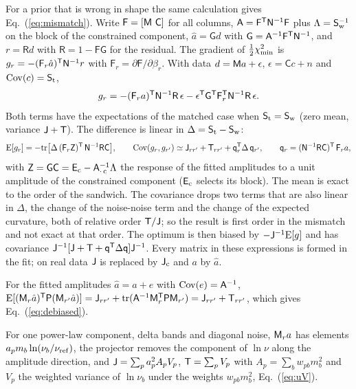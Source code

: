 For a prior that is wrong in shape the same calculation gives Eq.~(\ref{eq:mismatch}). Write
$\mathsf{F} = [\mathsf{M}\ \mathsf{C}]$ for all columns, $\mathsf{A} = \mathsf{F}^{\mathsf{T}}\mathsf{N}^{-1}\mathsf{F}$ plus $\Lambda =
\mathsf{S}_{\rm w}^{-1}$ on the block of the constrained component, $\hat a = \mathsf{G} d$ with
$\mathsf{G} = \mathsf{A}^{-1}\mathsf{F}^{\mathsf{T}}\mathsf{N}^{-1}$, and $r = \mathsf{R} d$ with $\mathsf{R} = 1 - \mathsf{F}\mathsf{G}$
for the residual. The gradient of $\tfrac12\chi^2_{\min}$ is $g_r = -(\mathsf{F}_r\hat a)^{\mathsf{T}}\mathsf{N}^{-1} r$ with
$\mathsf{F}_r = \partial\mathsf{F}/\partial\beta_r$. With data $d = \mathsf{M} a + \epsilon$, $\epsilon = \mathsf{C} c + n$
and $\mathrm{Cov}(c) = \mathsf{S}_{\rm t}$,
\begin{equation}
  g_r = -(\mathsf{F}_r a)^{\mathsf{T}}\mathsf{N}^{-1}\mathsf{R}\,\epsilon - \epsilon^{\mathsf{T}}\mathsf{G}^{\mathsf{T}}\mathsf{F}_r^{\mathsf{T}}\mathsf{N}^{-1}\mathsf{R}\,\epsilon .
\end{equation}
Both terms have the expectations of the matched case when $\mathsf{S}_{\rm t} = \mathsf{S}_{\rm w}$ (zero mean,
variance $\mathsf{J} + \mathsf{T}$). The difference is linear in $\Delta = \mathsf{S}_{\rm t} - \mathsf{S}_{\rm w}$:
\begin{equation}
  \mathrm{E}[g_r] = -\mathrm{tr}\big[\Delta\,(\mathsf{F}_r\mathsf{Z})^{\mathsf{T}}\,\mathsf{N}^{-1}\mathsf{R}\mathsf{C}\big], \qquad
  \mathrm{Cov}(g_r, g_{r'}) \simeq \mathsf{J}_{rr'} + \mathsf{T}_{rr'} + \mathsf{q}_r^{\mathsf{T}}\Delta\,\mathsf{q}_{r'}, \qquad
  \mathsf{q}_r = (\mathsf{N}^{-1}\mathsf{R}\mathsf{C})^{\mathsf{T}}\,\mathsf{F}_r a ,
\end{equation}
with $\mathsf{Z} = \mathsf{G}\mathsf{C} = \mathsf{E}_{\rm c} - \mathsf{A}^{-1}_{\cdot\,{\rm c}}\Lambda$ the response of the
fitted amplitudes to a unit amplitude of the constrained component ($\mathsf{E}_{\rm c}$ selects its
block). The mean is exact to the order of the sandwich. The covariance drops two terms that are also
linear in $\Delta$, the change of the noise-noise term and the change of the expected curvature, both
of relative order $\mathsf{T}/\mathsf{J}$; so the result is first order in the mismatch and not exact at that order. The optimum is then biased by $-\mathsf{J}^{-1}\mathrm{E}[g]$ and has covariance
$\mathsf{J}^{-1}[\mathsf{J} + \mathsf{T} + \mathsf{q}^{\mathsf{T}}\Delta\mathsf{q}]\mathsf{J}^{-1}$. Every matrix in these expressions is formed in the
fit; on real data $\mathsf{J}$ is replaced by $\mathsf{J}_{\rm c}$ and $a$ by $\hat a$.

For the fitted amplitudes $\hat a = a + e$ with $\mathrm{Cov}(e) = \mathsf{A}^{-1}$,
$\mathrm{E}[(\mathsf{M}_r\hat a)^{\mathsf{T}}\mathsf{P}(\mathsf{M}_{r'}\hat a)] = \mathsf{J}_{rr'} + \mathrm{tr}(\mathsf{A}^{-1}\mathsf{M}_r^{\mathsf{T}}\mathsf{P}\mathsf{M}_{r'}) = \mathsf{J}_{rr'} + \mathsf{T}_{rr'}$,
which gives Eq.~(\ref{eq:debiased}).

For one power-law component, delta bands and diagonal noise, $\mathsf{M}_r a$ has elements
$a_p m_b \ln(\nu_b/\nu_{\mathrm{ref}})$, the projector removes the component of $\ln\nu$ along the amplitude
direction, and $\mathsf{J} = \sum_p a_p^2 A_p V_p$, $\mathsf{T} = \sum_p V_p$ with $A_p = \sum_b w_{pb}m_b^2$ and
$V_p$ the weighted variance of $\ln\nu_b$ under the weights $w_{pb}m_b^2$, Eq.~(\ref{eq:uV}).
